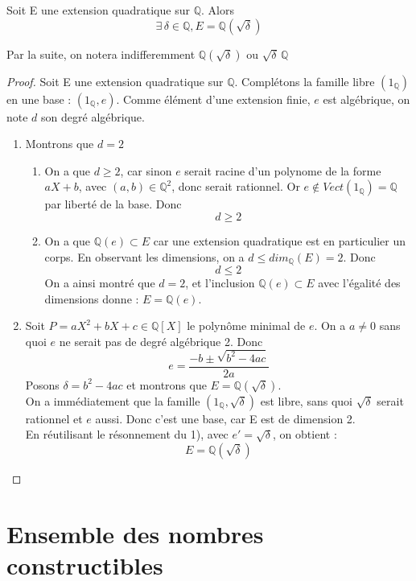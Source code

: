 \documentclass[a4paper,12pt,french,draft]{report}
\begin{document}
		\begin{proposition}
			Soit E une extension quadratique sur $\mathbb{Q}$. Alors
			\[{}
				\exists\, \delta \in \mathbb{Q}, E = \mathbb{Q}(\sqrt{\delta})
			\]
		\end{proposition}
		 Par la suite, on notera indifferemment $\mathbb{Q}(\sqrt{\delta})$ ou $\sqrt{\delta}\,\mathbb{Q}$
		\begin{proof}
			Soit E une extension quadratique sur $\mathbb{Q}$. Complétons la famille libre $(1_{\mathbb{Q}})$ en une base : $(1_{\mathbb{Q}},e)$. Comme élément d'une extension finie, $e$ est algébrique, on note $d$ son degré algébrique.
			\begin{enumerate}
				\item  Montrons que $d = 2$
				\begin{enumerate}
				    \item On a que $d\geq2$, car sinon $e$ serait racine d'un polynome de la forme $aX +b$, avec $(a,b) \in \mathbb{Q}^{2}$, donc serait rationnel. Or  $e \notin Vect(1_{\mathbb{Q}}) = \mathbb{Q}$ par liberté de la base. Donc \[d\geq 2\]
				    \item On a que $\mathbb{Q}(e) \subset E $ car une extension quadratique est en particulier un corps. En observant les dimensions, on a $d \leq dim_{\mathbb{Q}}(E) = 2$. Donc 
				    \[d \leq 2\] On a ainsi montré que $d=2$, et l'inclusion $\mathbb{Q}(e) \subset E $ avec l'égalité des dimensions donne : $E = \mathbb{Q}(e)$.
				\end{enumerate}
				
				\item  Soit $P = aX^{2} + bX +c \in \mathbb{Q}[X]$ le polynôme minimal de $e$. On a $a\neq 0$ sans quoi $e$ ne serait pas de degré algébrique 2. Donc \[e = \frac{-b \pm \sqrt{b^{2} - 4ac}}{2a}\]
				Posons $\delta = b^{2} - 4ac$ et montrons que $E = \mathbb{Q}(\sqrt{\delta})$.\\
				On a immédiatement que la famille \((1_{\mathbb{Q}},\sqrt{\delta})\) est libre, sans quoi $\sqrt{\delta}$ serait rationnel et $e$ aussi. Donc c'est une base, car E est de dimension 2.\\
				En réutilisant le résonnement du 1), avec $e' = \sqrt{\delta}$, on obtient : \[E = \mathbb{Q}(\sqrt{\delta})\]
			\end{enumerate}
		\end{proof}


		\section{Ensemble des nombres constructibles}
		
\end{document}
